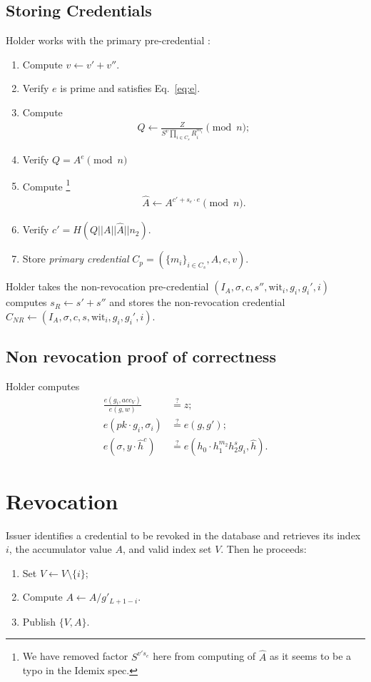\documentclass[a4paper]{article}
\begin{document}
\subsection{Storing Credentials}
Holder works with the primary pre-credential :
\begin{enumerate}
\item Compute $v \leftarrow v'+v''$.
\item Verify $e$ is prime and satisfies Eq.~\eqref{eq:e}.
\item Compute
\begin{align}
Q\leftarrow \frac{Z}{S^v\prod_{i \in C_s}R_i^{m_i}}\pmod{n};
\end{align}
\item Verify $Q = A^e\pmod{n}$
\item Compute
\footnote{We have removed factor $S^{v's_e}$ here from computing of $\widehat{A}$ as it seems to be a typo in the Idemix spec.}
\begin{align}
\widehat{A}\leftarrow A^{c'+s_e\cdot e} \pmod{n}.
\end{align}
\item Verify $c'=H(Q||A||\widehat{A}||n_2).$
\item Store \emph{primary credential} $C_p=(\{m_i\}_{i \in C_s},A,e,v)$.
\end{enumerate}
Holder takes the non-revocation pre-credential $(I_A,\sigma,c,s'',\mathrm{wit}_i,g_i,g_i',i)$ computes $s_R \leftarrow s'+s''$ and stores the non-revocation credential $C_{NR}\leftarrow(I_A,\sigma,c,s,\mathrm{wit}_i,g_i,g_i',i)$.
\subsection{Non revocation proof of correctness} Holder computes
\begin{align}
\frac{e(g_i,acc_V)}{e(g,w)} &\overset{\text{?}}{=} z;\\
e(pk\cdot g_i, \sigma_i) &\overset{\text{?}}{=} e(g,g');\\
e(\sigma,y\cdot \widehat{h}^c)& \overset{\text{?}}{=} e(h_0 \cdot h_1^{m_2}h_2^{s}g_i,\widehat{h}).
\end{align}


\section{Revocation}
Issuer identifies a credential to be revoked in the database and retrieves its index $i$, the  accumulator value $A$, and valid index set $V$. Then he proceeds:
\begin{enumerate}
\item Set $V\leftarrow V\setminus\{i\}$;
\item Compute $A \leftarrow A/g'_{L+1-i}$.
\item Publish $\{V,A\}$.
\end{enumerate}
\end{document}
